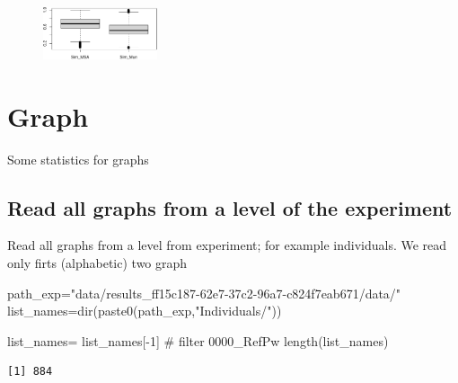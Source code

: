 \documentclass[
  letterpaper,
  DIV=11,
  numbers=noendperiod]{scrreprt}
\newenvironment{Shaded}{\begin{snugshade}}{\end{snugshade}}
\newcommand{\CommentTok}[1]{\textcolor[rgb]{0.37,0.37,0.37}{#1}}
\newcommand{\DecValTok}[1]{\textcolor[rgb]{0.68,0.00,0.00}{#1}}
\newcommand{\FunctionTok}[1]{\textcolor[rgb]{0.28,0.35,0.67}{#1}}
\newcommand{\NormalTok}[1]{\textcolor[rgb]{0.00,0.23,0.31}{#1}}
\newcommand{\OtherTok}[1]{\textcolor[rgb]{0.00,0.23,0.31}{#1}}
\newcommand{\SpecialCharTok}[1]{\textcolor[rgb]{0.37,0.37,0.37}{#1}}
\newcommand{\StringTok}[1]{\textcolor[rgb]{0.13,0.47,0.30}{#1}}
\begin{document}
\begin{figure}[H]

{\centering \includegraphics[width=0.3\textwidth,height=\textheight]{index_files/figure-pdf/unnamed-chunk-45-1.pdf}

}

\end{figure}


\hypertarget{graph}{%
\chapter*{Graph}\label{graph}}


Some statistics for graphs

\hypertarget{read-all-graphs-from-a-level-of-the-experiment}{%
\section*{Read all graphs from a level of the
experiment}\label{read-all-graphs-from-a-level-of-the-experiment}}


Read all graphs from a level from experiment; for example individuals.
We read only firts (alphabetic) two graph

\begin{Shaded}
\begin{Highlighting}[]
\NormalTok{path\_exp}\OtherTok{=}\StringTok{"data/results\_ff15c187{-}62e7{-}37c2{-}96a7{-}c824f7eab671/data/"}
\NormalTok{list\_names}\OtherTok{=}\FunctionTok{dir}\NormalTok{(}\FunctionTok{paste0}\NormalTok{(path\_exp,}\StringTok{"Individuals/"}\NormalTok{))}

\NormalTok{list\_names}\OtherTok{=}\NormalTok{ list\_names[}\SpecialCharTok{{-}}\DecValTok{1}\NormalTok{] }\CommentTok{\# filter 0000\_RefPw}
\FunctionTok{length}\NormalTok{(list\_names)}
\end{Highlighting}
\end{Shaded}

\begin{verbatim}
[1] 884
\end{verbatim}
\end{document}
